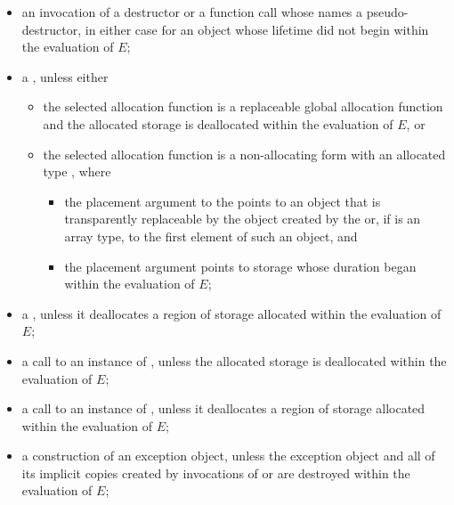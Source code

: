 \begin{itemize}
\item
an invocation of a destructor or a function call
whose  names a pseudo-destructor,
in either case for an object whose lifetime did not begin within the evaluation of $E$;

\item
a ,
unless either
\begin{itemize}
\item
the selected allocation function is
a replaceable global allocation function and
the allocated storage is deallocated within the evaluation of $E$, or
\item
the selected allocation function is
a non-allocating form
with an allocated type , where
\begin{itemize}
\item
the placement argument to the  points
to an object that is transparently replaceable by
the object created by the 
or, if  is an array type,
to the first element of such an object, and
\item
the placement argument points to storage
whose duration began within the evaluation of $E$;
\end{itemize}
\end{itemize}

\item
a ,
unless it deallocates a region of storage
allocated within the evaluation of $E$;

\item
a call to an instance of
,
unless the allocated storage is deallocated within the evaluation of $E$;

\item
a call to an instance of
,
unless it deallocates a region of storage
allocated within the evaluation of $E$;

\item
a construction of an exception object,
unless the exception object and
all of its implicit copies created by invocations of
 or 
are destroyed within the evaluation of $E$;


\end{itemize}

